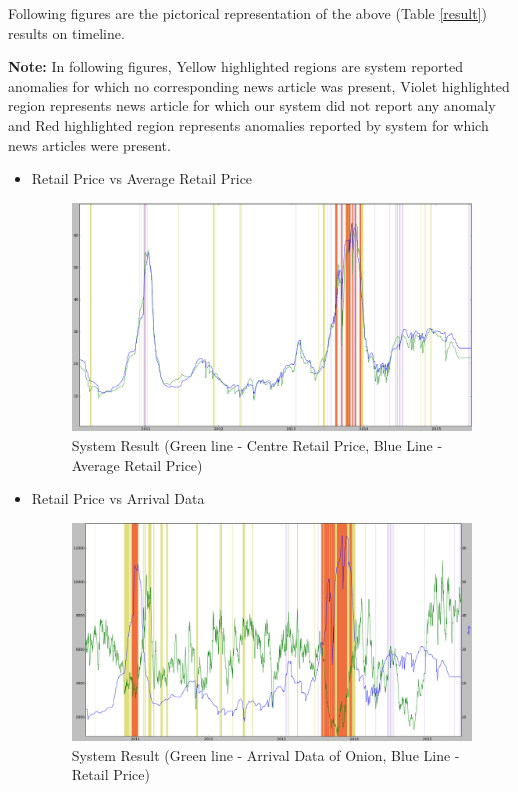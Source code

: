 \documentclass[a4paper,10pt]{article}
\begin{document}
Following figures are the pictorical representation of the above (Table \ref{result}) results on timeline.

\textbf{Note:} In following figures, Yellow highlighted regions are system reported anomalies for which no corresponding news article was present, Violet highlighted region represents news article for which our system did not report any anomaly and Red highlighted region represents anomalies reported by system for which news articles were present.

\begin{itemize}
 \item Retail Price vs Average Retail Price
			
			\begin{figure}[H]
		    	\centering
  		    	\includegraphics[width=1.1\textwidth]{graphs/RvsAvg_Whole.png}
		    	\caption{System Result (Green line - Centre Retail Price, Blue Line - Average Retail Price)}
		    	\label{fig:RvsR}
			\end{figure}
			
	
 \item Retail Price vs Arrival Data
			
			\begin{figure}[H]
		    	\centering
  		    	\includegraphics[width=1.1\textwidth]{graphs/RetailVsArrival_whole.png}
		    	\caption{System Result (Green line - Arrival Data of Onion, Blue Line - Retail Price)}
		    	\label{fig:RvsA}
			\end{figure}
			

\end{itemize}
\end{document}
